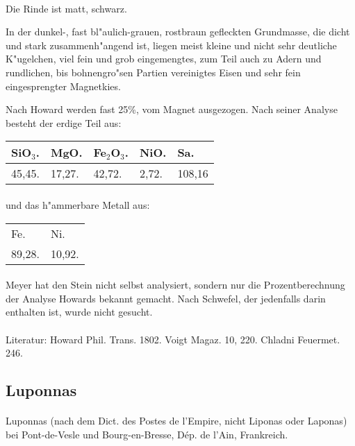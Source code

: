 \documentclass[a4paper, 11pt, oneside]{article}
\begin{document}
\paragraph{}
Die Rinde ist matt, schwarz.

In der dunkel-, fast bl"aulich-grauen, rostbraun gefleckten Grundmasse, die dicht und stark zusammenh"angend ist, liegen meist kleine und nicht sehr deutliche K"ugelchen, viel fein und grob eingemengtes, zum Teil auch zu Adern und rundlichen, bis bohnengro"sen Partien vereinigtes Eisen und sehr fein eingesprengter Magnetkies.

Nach Howard werden fast 25\%, vom Magnet ausgezogen. Nach seiner Analyse besteht der erdige Teil aus:
\begin{table}[!ht]
    \centering
    \begin{tabular}{l l l l l}
        SiO$_{3}$. & MgO. & Fe$_{2}$O$_{3}$. & NiO. & Sa.\\\hline
        45,45. & 17,27. & 42,72. & 2,72. & 108,16
    \end{tabular}
\end{table}
\paragraph{}
und das h"ammerbare Metall aus:
\begin{table}[!ht]
    \centering
    \begin{tabular}{l l}
        Fe. & Ni.\\
        89,28. & 10,92.
    \end{tabular}
\end{table}
\paragraph{}
Meyer hat den Stein nicht selbst analysiert, sondern nur die Prozentberechnung der Analyse Howards bekannt gemacht. Nach Schwefel, der jedenfalls darin enthalten ist, wurde nicht gesucht.
\footnotesize
\paragraph{}
Literatur: Howard Phil. Trans. 1802. Voigt Magaz. 10, 220. Chladni Feuermet. 246.
\subsection{Luponnas}
\normalsize
\paragraph{}
Luponnas (nach dem Dict. des Postes de l'Empire, nicht Liponas oder Laponas) bei Pont-de-Vesle und Bourg-en-Bresse, Dép. de l'Ain, Frankreich.
\end{document}
